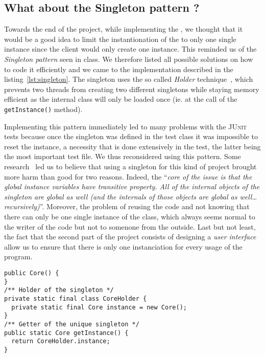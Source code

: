 
\subsection{What about the Singleton pattern ?} %
\label{sub:what_about_the_singleton_pattern}
Towards the end of the project, while implementing the \Core,
we thought that it would be a good idea to limit
the instantionation of the \Core to only one single instance
since the client would only create one instance.
This reminded us of the \emph{Singleton pattern} seen in class.
We therefore listed all possible solutions on how to code
it efficiently and we came to the implementation described
in the listing~\ref{lst:singleton}.
The singleton uses the so called \emph{Holder} technique~\cite{goodSingleton},
which prevents two threads from creating two different singletons
while staying memory efficient as the internal class will only be
loaded once (ie. at the call of the \lstinline|getInstance()| method).

Implementing this pattern immediately led to many problems with
the \textsc{JUnit} tests because once the singleton was defined in the test class it
was impossible to reset the instance, a necessity that is done extensively
in the \Core test, the latter being the most important test file.
We thus reconsidered using this pattern.
Some research~\cite{singletonLiars} led us to believe that using a singleton for this kind
of project brought more harm than good for two reasons.
Indeed, the ``\textit{core of the issue is that the global instance 
variables have transitive property. All of the internal objects of the 
singleton are global as well (and the internals of those objects are 
global as well\dots recursively)}''\cite{codeHardToTest}.
Moreover, the problem of reusing the code and not knowing that
there can only be one single instance of the \Core class,
which always seems normal to the writer of the code but not
to somenone from the outside.
Last but not least, the fact that the second part of the project consists of
designing a \emph{user interface} allow us to ensure that there is only one instanciation
for every usage of the program.

\vspace{1cm}

\begin{lstlisting}[caption=How the implementation of the Singleton pattern
  would look like.,
  label=lst:singleton] 
public Core() {
}
/** Holder of the singleton */
private static final class CoreHolder {		
  private static final Core instance = new Core();
}
/** Getter of the unique singleton */
public static Core getInstance() {
  return CoreHolder.instance;
}
\end{lstlisting}
  

